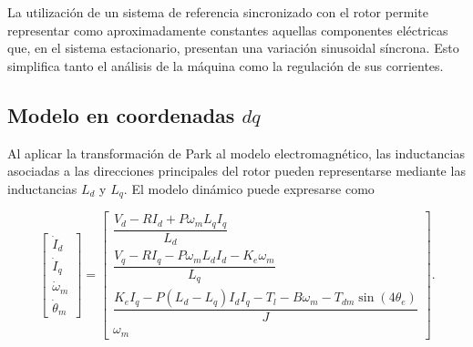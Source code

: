 La utilización de un sistema de referencia sincronizado con el rotor permite 
representar como aproximadamente constantes aquellas componentes eléctricas 
que, en el sistema estacionario, presentan una variación sinusoidal síncrona. 
Esto simplifica tanto el análisis de la máquina como la regulación de sus 
corrientes.

%
%
%



\subsection{Modelo en coordenadas \texorpdfstring{$dq$}{dq}}

%
%

Al aplicar la transformación de Park al modelo electromagnético, las 
inductancias asociadas a las direcciones principales del rotor pueden 
representarse mediante las inductancias $L_d$ y $L_q$. El modelo dinámico 
puede expresarse como

\begin{equation}
\label{eq:modelo_dq}
\begin{bmatrix} 
    \dot{I}_d \\ 
    \dot{I}_q \\ 
    \dot{\omega}_m \\ 
    \dot{\theta}_m 
\end{bmatrix}
=
\begin{bmatrix} 
    \dfrac{V_d-RI_d+P\omega_mL_qI_q}{L_d}\\[8pt]
    \dfrac{V_q-RI_q-P\omega_mL_dI_d-K_e\omega_m}{L_q}\\[8pt]
    \dfrac{
        K_eI_q
        -P(L_d-L_q)I_dI_q
        -T_l
        -B\omega_m
        -T_{dm}\sin(4\theta_e)
    }{J}\\[8pt]
    \omega_m
\end{bmatrix}.
\end{equation}

